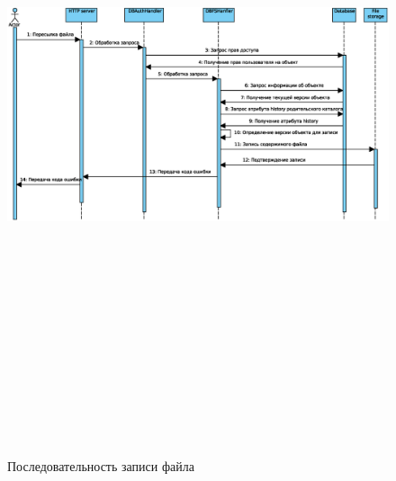 \documentclass[utf8,usehyperref,12pt]{G7-32}
\begin{document}
\begin{figure}[h]
   \centering%
   \includegraphics[height=200mm, width=1\textwidth, angle=90, clip, keepaspectratio]{pictures/put_seq}
   \caption{Последовательность записи файла}\label{fig:put_seq}
 \end{figure}
\end{document}
